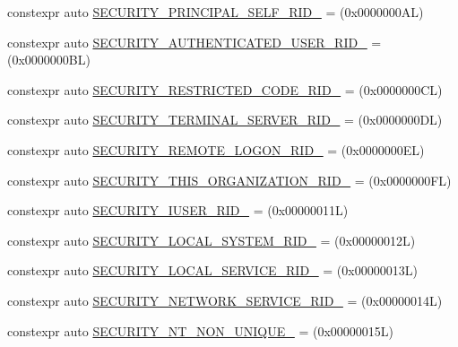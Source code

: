 \begin{DoxyCompactItemize}
\item 
constexpr auto \mbox{\hyperlink{namespaceboost_1_1winapi_a759f5ccfd6a3e7cd5eba8204698e8d17}{S\+E\+C\+U\+R\+I\+T\+Y\+\_\+\+P\+R\+I\+N\+C\+I\+P\+A\+L\+\_\+\+S\+E\+L\+F\+\_\+\+R\+I\+D\+\_\+}} = (0x0000000\+A\+L)
\item 
constexpr auto \mbox{\hyperlink{namespaceboost_1_1winapi_a08248ea94d941e4ddac040357d4dd9e8}{S\+E\+C\+U\+R\+I\+T\+Y\+\_\+\+A\+U\+T\+H\+E\+N\+T\+I\+C\+A\+T\+E\+D\+\_\+\+U\+S\+E\+R\+\_\+\+R\+I\+D\+\_\+}} = (0x0000000\+B\+L)
\item 
constexpr auto \mbox{\hyperlink{namespaceboost_1_1winapi_ad637fad134a8c7609652186a0119d3df}{S\+E\+C\+U\+R\+I\+T\+Y\+\_\+\+R\+E\+S\+T\+R\+I\+C\+T\+E\+D\+\_\+\+C\+O\+D\+E\+\_\+\+R\+I\+D\+\_\+}} = (0x0000000\+C\+L)
\item 
constexpr auto \mbox{\hyperlink{namespaceboost_1_1winapi_a55820c77e65098401e716a1b46f9b30f}{S\+E\+C\+U\+R\+I\+T\+Y\+\_\+\+T\+E\+R\+M\+I\+N\+A\+L\+\_\+\+S\+E\+R\+V\+E\+R\+\_\+\+R\+I\+D\+\_\+}} = (0x0000000\+D\+L)
\item 
constexpr auto \mbox{\hyperlink{namespaceboost_1_1winapi_af65bec58c768fbab4f82950208208e18}{S\+E\+C\+U\+R\+I\+T\+Y\+\_\+\+R\+E\+M\+O\+T\+E\+\_\+\+L\+O\+G\+O\+N\+\_\+\+R\+I\+D\+\_\+}} = (0x0000000\+E\+L)
\item 
constexpr auto \mbox{\hyperlink{namespaceboost_1_1winapi_a69e15772aa19cbc30920bad69f404ecd}{S\+E\+C\+U\+R\+I\+T\+Y\+\_\+\+T\+H\+I\+S\+\_\+\+O\+R\+G\+A\+N\+I\+Z\+A\+T\+I\+O\+N\+\_\+\+R\+I\+D\+\_\+}} = (0x0000000\+F\+L)
\item 
constexpr auto \mbox{\hyperlink{namespaceboost_1_1winapi_adbe16815378b634d18a63d706dea6b0d}{S\+E\+C\+U\+R\+I\+T\+Y\+\_\+\+I\+U\+S\+E\+R\+\_\+\+R\+I\+D\+\_\+}} = (0x00000011\+L)
\item 
constexpr auto \mbox{\hyperlink{namespaceboost_1_1winapi_ae7e4a9f47341640eb541f85dd432a8e4}{S\+E\+C\+U\+R\+I\+T\+Y\+\_\+\+L\+O\+C\+A\+L\+\_\+\+S\+Y\+S\+T\+E\+M\+\_\+\+R\+I\+D\+\_\+}} = (0x00000012\+L)
\item 
constexpr auto \mbox{\hyperlink{namespaceboost_1_1winapi_a265f8fb311190fac275d369ca5b64b91}{S\+E\+C\+U\+R\+I\+T\+Y\+\_\+\+L\+O\+C\+A\+L\+\_\+\+S\+E\+R\+V\+I\+C\+E\+\_\+\+R\+I\+D\+\_\+}} = (0x00000013\+L)
\item 
constexpr auto \mbox{\hyperlink{namespaceboost_1_1winapi_a4be6e289f2aea5983ee338d813f56f8d}{S\+E\+C\+U\+R\+I\+T\+Y\+\_\+\+N\+E\+T\+W\+O\+R\+K\+\_\+\+S\+E\+R\+V\+I\+C\+E\+\_\+\+R\+I\+D\+\_\+}} = (0x00000014\+L)
\item 
constexpr auto \mbox{\hyperlink{namespaceboost_1_1winapi_a21bb9b789166aca115ceeddb74fc9e6e}{S\+E\+C\+U\+R\+I\+T\+Y\+\_\+\+N\+T\+\_\+\+N\+O\+N\+\_\+\+U\+N\+I\+Q\+U\+E\+\_\+}} = (0x00000015\+L)

\end{DoxyCompactItemize}
